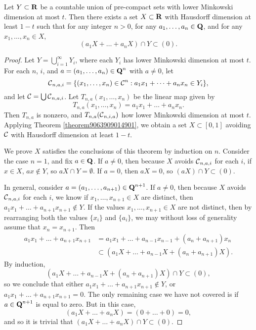\begin{theorem}
    Let $Y \subset \operatorname{\mathbf{R}}$ be a countable union of pre-compact sets with lower Minkowski dimension at most $t$. Then there exists a set $X \subset \operatorname{\mathbf{R}}$ with Hausdorff dimension at least $1 - t$ such that for any integer $n > 0$, for any $a_1, \dots, a_n \in \operatorname{\mathbf{Q}}$, and for any $x_1, \dots, x_n \in X$,
    \[ (a_1X + \dots + a_n X) \cap Y \subset (0). \]
\end{theorem}
\begin{proof}
    Let $Y = \bigcup_{i = 1}^\infty Y_i$, where each $Y_i$ has lower Minkowski dimension at most $t$. For each $n$, $i$, and $a = (a_1, \dots, a_n) \in \operatorname{\mathbf{Q}}^n$ with $a \neq 0$, let
    \[ \operatorname{\mathcal{C}}_{n,a,i} = \{ (x_1, \dots, x_n) \in \operatorname{\mathcal{C}}^n : a_1x_1 + \dots + a_nx_n \in Y_i \}, \]
    and let $\operatorname{\mathcal{C}} = \bigcup \operatorname{\mathcal{C}}_{n,a,i}$. Let $T_{n,a}(x_1,\dots,x_n)$ be the linear map given by
    \[ T_{n,a}(x_1,\dots,x_n) = a_1x_1 + \dots + a_nx_n. \]
    Then $T_{n,a}$ is nonzero, and $T_{n,a}(\operatorname{\mathcal{C}}_{n,i,a})$ how lower Minkowski dimension at most $t$. Applying Theorem \ref{theorem9063909014901}, we obtain a set $X \subset [0,1]$ avoiding $\operatorname{\mathcal{C}}$ with Hausdorff dimension at least $1 - t$.

    We prove $X$ satisfies the conclusions of this theorem by induction on $n$. Consider the case $n = 1$, and fix $a \in \operatorname{\mathbf{Q}}$. If $a \neq 0$, then because $X$ avoids $\operatorname{\mathcal{C}}_{n,a,i}$ for each $i$, if $x \in X$, $ax \not \in Y$, so $aX \cap Y = \emptyset$. If $a = 0$, then $aX = 0$, so $(aX) \cap Y \subset (0)$.

    In general, consider $a = (a_1, \dots, a_{n+1}) \in \operatorname{\mathbf{Q}}^{n+1}$. If $a \neq 0$, then because $X$ avoids $\operatorname{\mathcal{C}}_{n,a,i}$ for each $i$, we know if $x_1, \dots, x_{n+1} \in X$ are distinct, then $a_1 x_1 + \dots + a_{n+1} x_{n+1} \not \in Y$. If the values $x_1, \dots, x_{n+1} \in X$ are not distinct, then by rearranging both the values $\{ x_i \}$ and $\{ a_i \}$, we may without loss of generality assume that $x_n = x_{n+1}$. Then
    \begin{align*}
        a_1 x_1 + \dots + a_{n+1} x_{n+1} &= a_1 x_1 + \dots + a_{n-1} x_{n-1} + (a_n + a_{n+1}) x_n\\
        &\subset (a_1 X + \dots + a_{n-1} X + (a_n + a_{n+1}) X).
    \end{align*}
    By induction,
    \[ (a_1 X + \dots + a_{n-1} X + (a_n + a_{n+1}) X) \cap Y \subset (0), \]
    so we conclude that either $a_1 x_1 + \dots + a_{n+1} x_{n+1} \not \in Y$, or $a_1x_1 + \dots + a_{n+1} x_{n+1} = 0$. The only remaining case we have not covered is if $a \in \operatorname{\mathbf{Q}}^{n+1}$ is equal to zero. But in this case,
    \[ (a_1 X + \dots + a_n X) = (0 + \dots + 0) = 0, \]
    and so it is trivial that $(a_1 X + \dots + a_n X) \cap Y \subset (0)$.
\end{proof}

